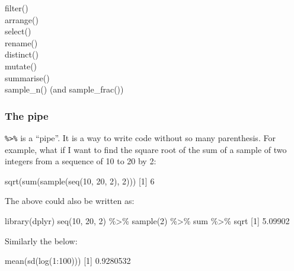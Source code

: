 \documentclass[
]{book}
\newenvironment{Shaded}{\begin{snugshade}}{\end{snugshade}}
\newcommand{\DecValTok}[1]{\textcolor[rgb]{0.00,0.00,0.81}{#1}}
\newcommand{\FloatTok}[1]{\textcolor[rgb]{0.00,0.00,0.81}{#1}}
\newcommand{\FunctionTok}[1]{\textcolor[rgb]{0.00,0.00,0.00}{#1}}
\newcommand{\NormalTok}[1]{#1}
\newcommand{\SpecialCharTok}[1]{\textcolor[rgb]{0.00,0.00,0.00}{#1}}
\begin{document}
filter()\\
arrange()\\
select()\\
rename()\\
distinct()\\
mutate()\\
summarise()\\
sample\_n() (and sample\_frac())

\hypertarget{the-pipe}{%
\subsubsection{The pipe}\label{the-pipe}}

\texttt{\%\textgreater{}\%} is a ``pipe''. It is a way to write code without so many parenthesis. For example, what if I want to find the square root of the sum of a sample of two integers from a sequence of 10 to 20 by 2:

\begin{Shaded}
\begin{Highlighting}[]
\FunctionTok{sqrt}\NormalTok{(}\FunctionTok{sum}\NormalTok{(}\FunctionTok{sample}\NormalTok{(}\FunctionTok{seq}\NormalTok{(}\DecValTok{10}\NormalTok{, }\DecValTok{20}\NormalTok{, }\DecValTok{2}\NormalTok{), }\DecValTok{2}\NormalTok{)))}
\NormalTok{[}\DecValTok{1}\NormalTok{] }\DecValTok{6}
\end{Highlighting}
\end{Shaded}

The above could also be written as:

\begin{Shaded}
\begin{Highlighting}[]
\FunctionTok{library}\NormalTok{(dplyr)}
\FunctionTok{seq}\NormalTok{(}\DecValTok{10}\NormalTok{, }\DecValTok{20}\NormalTok{, }\DecValTok{2}\NormalTok{) }\SpecialCharTok{\%\textgreater{}\%} \FunctionTok{sample}\NormalTok{(}\DecValTok{2}\NormalTok{) }\SpecialCharTok{\%\textgreater{}\%}\NormalTok{ sum }\SpecialCharTok{\%\textgreater{}\%}\NormalTok{ sqrt}
\NormalTok{[}\DecValTok{1}\NormalTok{] }\FloatTok{5.09902}
\end{Highlighting}
\end{Shaded}

Similarly the below:

\begin{Shaded}
\begin{Highlighting}[]
\FunctionTok{mean}\NormalTok{(}\FunctionTok{sd}\NormalTok{(}\FunctionTok{log}\NormalTok{(}\DecValTok{1}\SpecialCharTok{:}\DecValTok{100}\NormalTok{)))}
\NormalTok{[}\DecValTok{1}\NormalTok{] }\FloatTok{0.9280532}
\end{Highlighting}
\end{Shaded}
\end{document}
